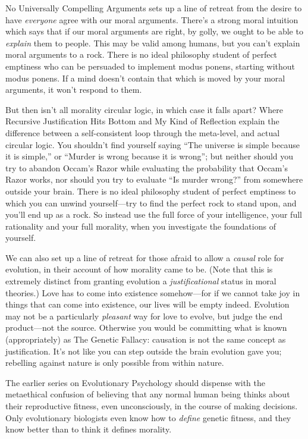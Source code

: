  No Universally Compelling Arguments sets up a line of retreat from
the desire to have \textit{everyone} agree with our moral arguments.
There's a strong moral intuition which says that if our
moral arguments are right, by golly, we ought to be able to
\textit{explain} them to people. This may be valid among humans, but
you can't explain moral arguments to a rock. There is
no ideal philosophy student of perfect emptiness who can be persuaded
to implement modus ponens, starting without modus ponens. If a mind
doesn't contain that which is moved by your moral
arguments, it won't respond to them.


 But then isn't all morality circular logic, in
which case it falls apart? Where Recursive Justification Hits Bottom
and My Kind of Reflection explain the difference between a
self-consistent loop through the meta-level, and actual circular logic.
You shouldn't find yourself saying
``The universe is simple because it is
simple,'' or ``Murder is wrong
because it is wrong''; but neither should you try to
abandon Occam's Razor while evaluating the probability
that Occam's Razor works, nor should you try to
evaluate ``Is murder wrong?'' from
somewhere outside your brain. There is no ideal philosophy student of
perfect emptiness to which you can unwind yourself---try to find the
perfect rock to stand upon, and you'll end up as a
rock. So instead use the full force of your intelligence, your full
rationality and your full morality, when you investigate the
foundations of yourself.


 We can also set up a line of retreat for those afraid to allow a
\textit{causal} role for evolution, in their account of how morality
came to be. (Note that this is extremely distinct from granting
evolution a \textit{justificational} status in moral theories.) Love
has to come into existence somehow---for if we cannot take joy in
things that can come into existence, our lives will be empty indeed.
Evolution may not be a particularly \textit{pleasant} way for love to
evolve, but judge the end product---not the source. Otherwise you would
be committing what is known (appropriately) as The Genetic Fallacy:
causation is not the same concept as justification.
It's not like you can step outside the brain evolution
gave you; rebelling against nature is only possible from within
nature.


 The earlier series on Evolutionary Psychology should dispense with
the metaethical confusion of believing that any normal human being
thinks about their reproductive fitness, even unconsciously, in the
course of making decisions. Only evolutionary biologists even know how
to \textit{define} genetic fitness, and they know better than to think
it defines morality.


